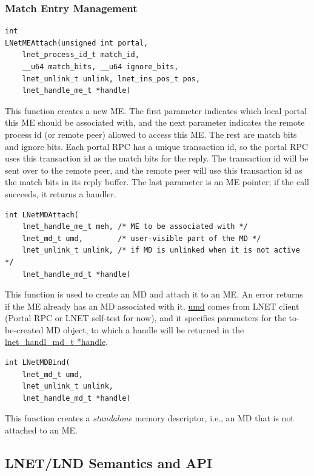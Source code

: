 \subsubsection*{Match Entry Management}

\begin{Verbatim}
int
LNetMEAttach(unsigned int portal,
    lnet_process_id_t match_id, 
    __u64 match_bits, __u64 ignore_bits,
    lnet_unlink_t unlink, lnet_ins_pos_t pos, 
    lnet_handle_me_t *handle)
\end{Verbatim}

This function creates a new ME. The first parameter indicates which local
portal this ME should be associated with, and the next parameter indicates the
remote process id (or remote peer) allowed to access this ME. The rest are
match bits and ignore bits. Each portal RPC has a unique transaction id, so the
portal RPC uses this transaction id as the match bits for the reply. The
transaction id will be sent over to the remote peer, and the remote peer will
use this transaction id as the match bits in its reply buffer. The last
parameter is an ME pointer; if the call succeeds, it returns a handler.

\begin{Verbatim}
int LNetMDAttach(
    lnet_handle_me_t meh, /* ME to be associated with */
    lnet_md_t umd,        /* user-visible part of the MD */
    lnet_unlink_t unlink, /* if MD is unlinked when it is not active */
    lnet_handle_md_t *handle)
\end{Verbatim}

This function is used to create an MD and attach it to an ME. An error returns if
the ME already has an MD associated with it. \url{umd} comes from LNET client
(Portal RPC or LNET self-test for now), and it specifies parameters for the
to-be-created MD object, to which a handle will be returned in the
\url{lnet_handl_md_t *handle}.

\begin{Verbatim}
int LNetMDBind(
    lnet_md_t umd, 
    lnet_unlink_t unlink, 
    lnet_handle_md_t *handle)
\end{Verbatim}

This function creates a \textit{standalone} memory descriptor, i.e., an
MD that is not attached to an ME.

\subsection{LNET/LND Semantics and API}

